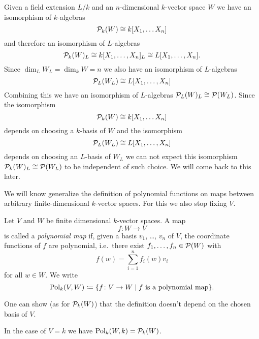 Given a field extension $L/k$ and an $n$-dimensional $k$-vector space $W$ we have an isomorphism of $k$-algebras
\[
        \mathcal{P}_k(W)
  \cong k[X_1, \dotsc X_n]
\]
and therefore an isomorphism of $L$-algebras
\[
        \mathcal{P}_k(W)_L
  \cong k[X_1, \dotsc, X_n]_L
  \cong L[X_1, \dotsc, X_n].
\]
Since $\dim_L W_L = \dim_k W = n$ we also have an isomorphism of $L$-algebras
\[
        \mathcal{P}_L(W_L)
  \cong L[X_1, \dotsc, X_n]
\]
Combining this we have an isomorphism of $L$-algebras $\mathcal{P}_L(W)_L \cong \mathcal{P}(W_L)$. Since the isomorphism
\[
        \mathcal{P}_k(W)
  \cong k[X_1, \dotsc X_n]
\]
depends on choosing a $k$-basis of $W$ and the isomorphism
\[
        \mathcal{P}_L(W_L)
  \cong L[X_1, \dotsc, X_n]
\]
depends on choosing an $L$-basis of $W_L$ we can not expect this isomorphism $\mathcal{P}_k(W)_L \cong \mathcal{P}(W_L)$ to be independent of such choice.
We will come back to this later.


We will know generalize the definition of polynomial functions on maps between arbitrary finite-dimensional $k$-vector spaces.
For this we also stop fixing $V$.


\begin{defi}
  Let $V$ and $W$ be finite dimensional $k$-vector spaces. A map
  \[
            f
    \colon  W
    \to     V
  \]
  is called a \emph{polynomial map} if, given a basis $v_1$, \dots, $v_n$ of $V$, the coordinate functions of $f$ are polynomial, i.e.\ there exist $f_1, \dotsc, f_n \in \mathcal{P}(W)$ with
  \[
      f(w)
    = \sum_{i=1}^n f_i(w) v_i
  \]
  for all $w \in W$.
  We write
  \[
              \operatorname{Pol}_k(V,W)
    \coloneqq \{
                        f
                \colon  V
                \to     W
              \mid
                f \text{ is a polynomial map}
              \}.
  \]
\end{defi}


\begin{rem}
  One can show (as for $\mathcal{P}_k(W)$) that the definition doesn’t depend on the chosen basis of $V$.
\end{rem}


\begin{rem}
  In the case of $V = k$ we have $\operatorname{Pol}_k(W,k) = \mathcal{P}_k(W)$.
\end{rem}


